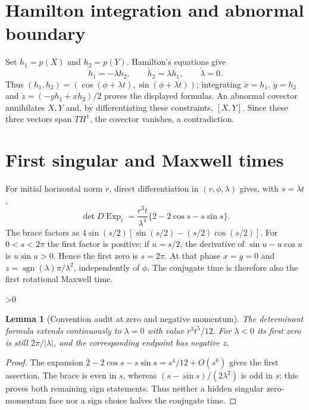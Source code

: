 \documentclass[10pt]{article}
\providecommand{\CRevisionRound}{2}
\newtheorem{lemma}{Lemma}
\begin{document}
\section{Hamilton integration and abnormal boundary}
Set $h_1=p(X)$ and $h_2=p(Y)$.  Hamilton's equations give
\[
 \dot h_1=-\lambda h_2,\qquad \dot h_2=\lambda h_1,
 \qquad \dot\lambda=0.
\]
Thus $(h_1,h_2)=(\cos(\phi+\lambda t),\sin(\phi+\lambda t))$; integrating
$\dot x=h_1$, $\dot y=h_2$ and
$\dot z=(-yh_1+xh_2)/2$ proves the displayed formulas.  An abnormal covector
annihilates $X,Y$ and, by differentiating these constraints, $[X,Y]$.
Since these three vectors span $TH^1$, the covector vanishes, a contradiction.

\section{First singular and Maxwell times}
For initial horizontal norm $r$, direct differentiation in
$(r,\phi,\lambda)$ gives, with $s=\lambda t$,
\[
 \det D\operatorname{Exp}_t=
 \frac{r^3t}{\lambda^4}\{2-2\cos s-s\sin s\}.
\]
The brace factors as
$4\sin(s/2)[\sin(s/2)-(s/2)\cos(s/2)]$.  For $0<s<2\pi$ the first factor is
positive; if $u=s/2$, the derivative of $\sin u-u\cos u$ is $u\sin u>0$.
Hence the first zero is $s=2\pi$.  At that phase $x=y=0$ and
$z=\operatorname{sgn}(\lambda)\pi/\lambda^2$, independently of $\phi$.
The conjugate time is therefore also the first rotational Maxwell time.

\ifnum\CRevisionRound>0
\begin{lemma}[Convention audit at zero and negative momentum]
The determinant formula extends continuously to $\lambda=0$ with value
$r^3t^5/12$.  For $\lambda<0$ its first zero is still
$2\pi/|\lambda|$, and the corresponding endpoint has negative $z$.
\end{lemma}
\begin{proof}
The expansion $2-2\cos s-s\sin s=s^4/12+O(s^6)$ gives the first assertion.
The brace is even in $s$, whereas
$(s-\sin s)/(2\lambda^2)$ is odd in $s$; this proves both remaining sign
statements.  Thus neither a hidden singular zero-momentum face nor a sign
choice halves the conjugate time.
\end{proof}
\fi
\end{document}
